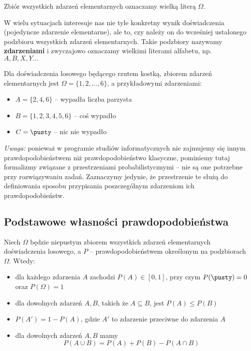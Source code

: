 Zbiór wszystkich zdarzeń elementarnych oznaczamy wielką literą $\Omega$.

W wielu sytuacjach interesuje nas nie tyle konkretny wynik doświadczenia (pojedyncze zdarzenie elementarne), ale to, czy należy on do wcześniej ustalonego podzbioru wszystkich zdarzeń elementarnych. Takie podzbiory nazywamy \textbf{zdarzeniami} i zwyczajowo oznaczamy wielkimi literami alfabetu, np. $A, B, X, Y...$

\begin{example}
    Dla doświadczenia losowego będącego rzutem kostką, zbiorem zdarzeń elementarnych jest $\Omega = \{1, 2, ..., 6\}$, a przykładowymi zdarzeniami:
    \begin{itemize}
        \item $A = \{2, 4, 6\}$ -- wypadła liczba parzysta
        \item $B = \{1, 2, 3, 4, 5, 6\}$ -- coś wypadło
        \item $C = \pusty$ -- nic nie wypadło
    \end{itemize}
\end{example}

\textit{Uwaga:} ponieważ w programie studiów informatycznych nie zajmujemy się innym prawdopodobieństwem niż prawdopodobieństwo klasyczne, pominiemy tutaj formalizmy związane z przestrzeniami probabilistycznymi -- nie są one potrzebne przy rozwiązywaniu zadań. Zaznaczymy jedynie, że przestrzenie te służą do definiowania sposobu przypisania poszczególnym zdarzeniom ich prawdopodobieństw.

\subsection{Podstawowe własności prawdopodobieństwa}

Niech $\Omega$ będzie niepustym zbiorem wszystkich zdarzeń elementarnych doświadczenia losowego, a $P$ -- prawdopodobieństwem określonym na podzbiorach $\Omega$. Wtedy:
\begin{itemize}
    \item dla każdego zdarzenia $A$ zachodzi $P(A) \in [0, 1]$, przy czym $P(\pusty) = 0$ oraz $P(\Omega) = 1$
    \item dla dowolnych zdarzeń $A, B$, takich że $A \subseteq B$, jest $P(A) \leq P(B)$
    \item $P(A') = 1 - P(A)$, gdzie $A'$ to zdarzenie przeciwne do zdarzenia $A$
    \item dla dowolnych zdarzeń $A, B$ mamy $$P(A \cup B) = P(A) + P(B) - P(A \cap B)$$
\end{itemize}

